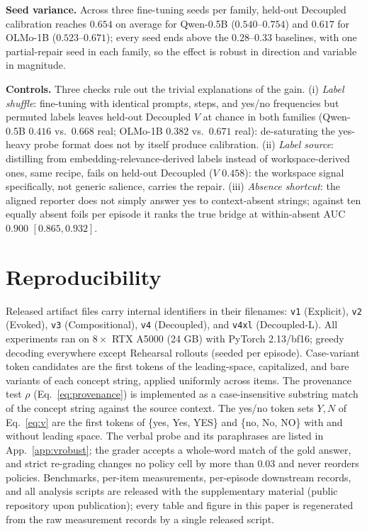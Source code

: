\textbf{Seed variance.} Across three fine-tuning seeds per family, held-out
Decoupled calibration reaches $0.654$ on average for Qwen-0.5B
($0.540$--$0.754$) and $0.617$ for OLMo-1B ($0.523$--$0.671$); every seed
ends above the $0.28$--$0.33$ baselines, with one partial-repair seed in
each family, so the effect is robust in direction and variable in magnitude.

\textbf{Controls.} Three checks rule out the trivial explanations of the
gain. (i) \emph{Label shuffle}: fine-tuning with identical prompts, steps,
and yes/no frequencies but permuted labels leaves held-out Decoupled $V$ at
chance in both families (Qwen-0.5B $0.416$ vs.\ $0.668$ real; OLMo-1B
$0.382$ vs.\ $0.671$ real): de-saturating the yes-heavy probe format does
not by itself produce calibration. (ii) \emph{Label source}: distilling from
embedding-relevance-derived labels instead of workspace-derived ones, same
recipe, fails on held-out Decoupled ($V$ $0.458$): the workspace signal
specifically, not generic salience, carries the repair.
(iii) \emph{Absence shortcut}: the aligned reporter does not simply answer
yes to context-absent strings; against ten equally absent foils per episode
it ranks the true bridge at within-absent AUC $0.900$ $[0.865, 0.932]$.

\section{Reproducibility}
\label{app:repro}
Released artifact files carry internal identifiers in their filenames:
\texttt{v1} (Explicit), \texttt{v2} (Evoked), \texttt{v3} (Compositional),
\texttt{v4} (Decoupled), and \texttt{v4xl} (Decoupled-L). All experiments ran on
$8\times$ RTX A5000 (24 GB) with PyTorch 2.13/bf16;
greedy decoding everywhere except Rehearsal rollouts (seeded per episode).
Case-variant token candidates are the first tokens of the leading-space,
capitalized, and bare variants of each concept string, applied uniformly across
items. The provenance test $\rho$ (Eq.~\ref{eq:provenance}) is implemented as
a case-insensitive substring match of the concept string against the source
context. The yes/no token sets $Y, N$ of Eq.~\ref{eq:v} are the first tokens
of \{yes, Yes, YES\} and \{no, No, NO\} with and without leading space. The verbal
probe and its paraphrases are listed in App.~\ref{app:vrobust}; the grader
accepts a whole-word match of the gold answer, and strict re-grading changes no
policy cell by more than $0.03$ and never reorders policies. Benchmarks,
per-item measurements, per-episode downstream records, and all analysis
scripts are released with the supplementary material (public repository upon
publication); every table and figure in this paper is regenerated from the raw
measurement records by a single released script.

